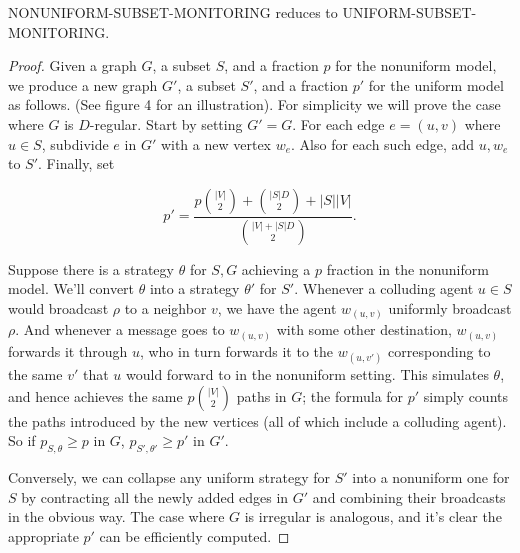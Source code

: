 \documentclass{comnet}
\providecommand{\DIFaddbegin}{} %
\providecommand{\DIFaddend}{} %
\providecommand{\DIFdelbegin}{} %
\providecommand{\DIFdelend}{} %
\begin{document}
\begin{proposition} \label{prop:uniform-reduction}

NONUNIFORM-SUBSET-MONITORING reduces to {{UNIFORM-SUBSET-MONITORING}}.

\end{proposition}


\DIFdelbegin %

\DIFdelend \begin{proof}

Given a graph $G$, a subset $S$, and a fraction $p$ for the nonuniform model,
we produce a new graph $G'$, a subset $S'$, and a fraction $p'$ for the uniform
model as follows.  (See figure 4 for an illustration). For simplicity we will
prove the case where $G$ is $D$-regular. Start by setting $G' = G$. For each
edge $e = (u,v)$ where $u \in S$, subdivide $e$ in $G'$ with a new vertex
$w_e$. Also for each such edge, add $u, w_e$ to $S'$.  Finally, set 

\[ 
   p' = \frac{p\binom{|V|}{2} + \binom{|S|D}{2} + |S||V|}{\binom{|V| +
   |S|D}{2}}.
\]

Suppose there is a strategy $\theta$ for $S,G$ achieving a $p$ fraction in the
nonuniform model. We'll convert $\theta$ into a strategy $\theta'$ for $S'$.
Whenever a colluding agent $u \in S$ would broadcast $\rho$ to a neighbor $v$,
we have the agent $w_{(u,v)}$ uniformly broadcast $\rho$.  And whenever a
message goes to $w_{(u,v)}$ with some other destination, $w_{(u,v)}$ forwards
it through $u$, who in turn forwards it to the $w_{(u,v')}$ corresponding to
the same $v'$ that $u$ would forward to in the nonuniform setting. This
simulates $\theta$, and hence achieves the same $p\binom{|V|}{2}$ paths in $G$;
the formula for $p'$ simply counts the paths introduced by the new vertices
(all of which include a colluding agent). So if $p_{S,\theta} \geq p$ in $G$,
$p_{S', \theta'} \geq p'$ in $G'$.

Conversely, we can collapse any uniform strategy for $S'$ into a nonuniform one
for $S$ by contracting all the newly added edges in $G'$ and combining their
broadcasts in the obvious way. The case where $G$ is irregular is analogous,
and it's clear the appropriate $p'$ can be efficiently computed.
\DIFaddbegin 

\DIFaddend \end{proof}
\end{document}
